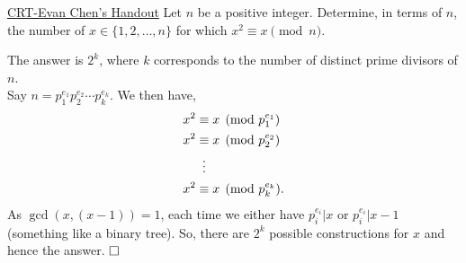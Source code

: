 \begin{problem}{4}{\href{https://web.evanchen.cc/handouts/CRT/CRT.pdf}{CRT-Evan Chen's Handout}}
	Let $n$ be a positive integer. Determine, in terms of $n$, the number of $x\in\{1,2, \ldots, n\}$ for which $x^2\equiv x\pmod{n}$.
	\begin{solution} The answer is $2^k$, where $k$ corresponds to the number of distinct prime divisors of $n$.\\
	Say $n=p_1^{e_1}p_2^{e_2}\cdots p_k^{e_k}$. We then have,
	\begin{align*}
		x^2 &\equiv x\pmod {p_1^{e_1}}\\
		x^2 &\equiv x\pmod {p_2^{e_2}}\\
		&\vdotswithin{\equiv}\\
		x^2 &\equiv x\pmod {p_k^{e_k}}.
	\end{align*}
	\indent As $\gcd(x, (x-1))=1$, each time we either have $p_i^{e_i}\lvert x$ or $p_i^{e_i}\lvert x-1$ (something like a binary tree). So, there are $2^k$ possible constructions for $x$ and hence the answer. $\qedwhite$
	\end{solution}
\end{problem}
